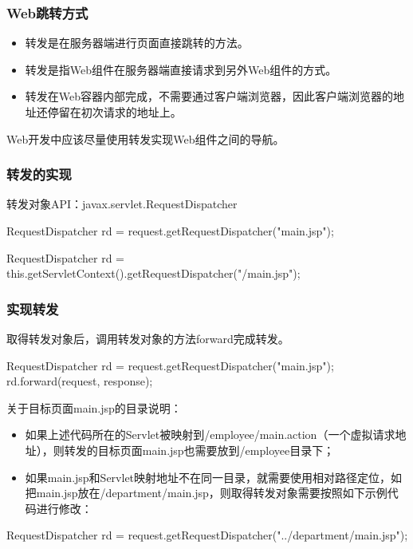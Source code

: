 \begin{frame}[fragile] %
\frametitle{Web跳转方式} 


\begin{itemize}
\item 转发是在服务器端进行页面直接跳转的方法。
\item 转发是指Web组件在服务器端直接请求到另外Web组件的方式。
\item 转发在Web容器内部完成，不需要通过客户端浏览器，因此客户端浏览器的地址还停留在初次请求的地址上。
\end{itemize}

{\hei Web开发中应该尽量使用转发实现Web组件之间的导航。}
\end{frame}

\begin{frame}[fragile] %
\frametitle{转发的实现} 

转发对象API：javax.servlet.RequestDispatcher



\begin{javaCode}
RequestDispatcher rd = request.getRequestDispatcher("main.jsp");
\end{javaCode}


\begin{javaCode}
RequestDispatcher rd = this.getServletContext().getRequestDispatcher("/main.jsp");
\end{javaCode}
\end{frame}

\begin{frame}[fragile] %
\frametitle{实现转发}

取得转发对象后，调用转发对象的方法forward完成转发。

\begin{javaCode}
RequestDispatcher rd = request.getRequestDispatcher("main.jsp");
rd.forward(request, response);
\end{javaCode}

关于目标页面main.jsp的目录说明：
\begin{itemize}
\item 如果上述代码所在的Servlet被映射到/employee/main.action（一个虚拟请求地址），则转发的目标页面main.jsp也需要放到/employee目录下；
\item 如果main.jsp和Servlet映射地址不在同一目录，就需要使用相对路径定位，如把main.jsp放在/department/main.jsp，则取得转发对象需要按照如下示例代码进行修改：
\end{itemize}

\begin{javaCode}
RequestDispatcher rd = request.getRequestDispatcher("../department/main.jsp");
\end{javaCode}
\end{frame}

